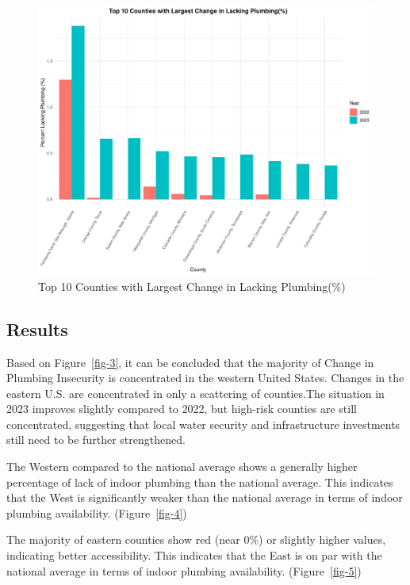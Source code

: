 \documentclass[
  letterpaper,
  DIV=11,
  numbers=noendperiod]{scrartcl}
\begin{document}
\begin{figure}[H]

{\centering \includegraphics{report_files/figure-pdf/fig-6-1.pdf}

}

\caption{\label{fig-6}Top 10 Counties with Largest Change in Lacking
Plumbing(\%)}

\end{figure}

\hypertarget{results}{%
\subsection{Results}\label{results}}

Based on Figure~\ref{fig-3}, it can be concluded that the majority of
Change in Plumbing Insecurity is concentrated in the western United
States. Changes in the eastern U.S. are concentrated in only a
scattering of counties.The situation in 2023 improves slightly compared
to 2022, but high-risk counties are still concentrated, suggesting that
local water security and infrastructure investments still need to be
further strengthened.

The Western compared to the national average shows a generally higher
percentage of lack of indoor plumbing than the national average. This
indicates that the West is significantly weaker than the national
average in terms of indoor plumbing availability. (Figure~\ref{fig-4})

The majority of eastern counties show red (near 0\%) or slightly higher
values, indicating better accessibility. This indicates that the East is
on par with the national average in terms of indoor plumbing
availability. (Figure~\ref{fig-5})
\end{document}
